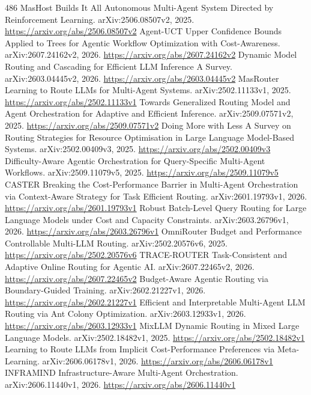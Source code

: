 \documentclass[11pt]{article}
\begin{document}
\begin{thebibliography}{486}
 MasHost Builds It All Autonomous Multi-Agent System Directed by Reinforcement Learning. arXiv:2506.08507v2, 2025. \url{https://arxiv.org/abs/2506.08507v2}
 Agent-UCT Upper Confidence Bounds Applied to Trees for Agentic Workflow Optimization with Cost-Awareness. arXiv:2607.24162v2, 2026. \url{https://arxiv.org/abs/2607.24162v2}
 Dynamic Model Routing and Cascading for Efficient LLM Inference A Survey. arXiv:2603.04445v2, 2026. \url{https://arxiv.org/abs/2603.04445v2}
 MasRouter Learning to Route LLMs for Multi-Agent Systems. arXiv:2502.11133v1, 2025. \url{https://arxiv.org/abs/2502.11133v1}
 Towards Generalized Routing Model and Agent Orchestration for Adaptive and Efficient Inference. arXiv:2509.07571v2, 2025. \url{https://arxiv.org/abs/2509.07571v2}
 Doing More with Less A Survey on Routing Strategies for Resource Optimisation in Large Language Model-Based Systems. arXiv:2502.00409v3, 2025. \url{https://arxiv.org/abs/2502.00409v3}
 Difficulty-Aware Agentic Orchestration for Query-Specific Multi-Agent Workflows. arXiv:2509.11079v5, 2025. \url{https://arxiv.org/abs/2509.11079v5}
 CASTER Breaking the Cost-Performance Barrier in Multi-Agent Orchestration via Context-Aware Strategy for Task Efficient Routing. arXiv:2601.19793v1, 2026. \url{https://arxiv.org/abs/2601.19793v1}
 Robust Batch-Level Query Routing for Large Language Models under Cost and Capacity Constraints. arXiv:2603.26796v1, 2026. \url{https://arxiv.org/abs/2603.26796v1}
 OmniRouter Budget and Performance Controllable Multi-LLM Routing. arXiv:2502.20576v6, 2025. \url{https://arxiv.org/abs/2502.20576v6}
 TRACE-ROUTER Task-Consistent and Adaptive Online Routing for Agentic AI. arXiv:2607.22465v2, 2026. \url{https://arxiv.org/abs/2607.22465v2}
 Budget-Aware Agentic Routing via Boundary-Guided Training. arXiv:2602.21227v1, 2026. \url{https://arxiv.org/abs/2602.21227v1}
 Efficient and Interpretable Multi-Agent LLM Routing via Ant Colony Optimization. arXiv:2603.12933v1, 2026. \url{https://arxiv.org/abs/2603.12933v1}
 MixLLM Dynamic Routing in Mixed Large Language Models. arXiv:2502.18482v1, 2025. \url{https://arxiv.org/abs/2502.18482v1}
 Learning to Route LLMs from Implicit Cost-Performance Preferences via Meta-Learning. arXiv:2606.06178v1, 2026. \url{https://arxiv.org/abs/2606.06178v1}
 INFRAMIND Infrastructure-Aware Multi-Agent Orchestration. arXiv:2606.11440v1, 2026. \url{https://arxiv.org/abs/2606.11440v1}

\end{thebibliography}
\end{document}
